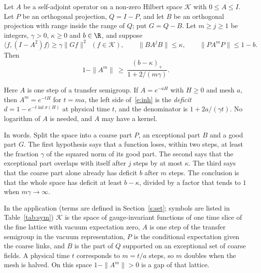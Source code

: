 \begin{theorem}\label{t:inh}
Let $A$ be a self-adjoint operator on a non-zero Hilbert space $\mathcal K$ with $0\le A\le I$. Let $P$ be an
orthogonal projection, $Q=I-P$, and let $B$ be an orthogonal projection with range inside the range of $Q$;
put $G=Q-B$. Let $m\ge j\ge1$ be integers, $\gamma>0$, $\kappa\ge0$ and $b\in\R$, and suppose
\begin{equation}\label{e:hyp}
\langle f,(I-A^{2})f\rangle\ge\gamma\|Gf\|^2\ \ (f\in\mathcal K),\qquad
\|BA^{j}B\|\le\kappa,\qquad \|PA^{m}P\|\le1-b .
\end{equation}
Then
\begin{equation}\label{e:inh}
1-\|A^m\|\ \ge\ \frac{(b-\kappa)_+}{1+2/(m\gamma)} .
\end{equation}
\end{theorem}

Here $A$ is one step of a transfer semigroup. If $A=e^{-aH}$ with $H\ge0$ and mesh $a$, then $A^m=e^{-tH}$ for
$t=ma$, the left side of~\eqref{e:inh} is the \emph{deficit} $d=1-e^{-t\inf\sigma(H)}$ at physical time $t$, and
the denominator is $1+2a/(\gamma t)$. No logarithm of $A$ is needed, and $A$ may have a kernel.

In words. Split the space into a coarse part $P$, an exceptional part $B$ and a good part $G$. The first
hypothesis says that a function loses, within two steps, at least the fraction $\gamma$ of the squared norm of
its good part. The second says that the exceptional part overlaps with itself after $j$ steps by at most
$\kappa$. The third says that the coarse part alone already has deficit $b$ after $m$ steps. The conclusion is
that the whole space has deficit at least $b-\kappa$, divided by a factor that tends to $1$ when $m\gamma\to\infty$.

In the application (terms are defined in Section~\ref{s:set}; symbols are listed in Table~\ref{tab:sym}) $\mathcal K$ is the space of gauge-invariant
functions of one time slice of the fine lattice with vacuum expectation zero, $A$ is one step of the transfer
semigroup in the vacuum representation, $P$ is the conditional expectation given the coarse links, and $B$
is the part of $Q$ supported on an exceptional set of coarse fields. A physical time $t$ corresponds to
$m=t/a$ steps, so $m$ doubles when the mesh is halved. On this space $1-\|A^m\|>0$ is a gap of that lattice.

